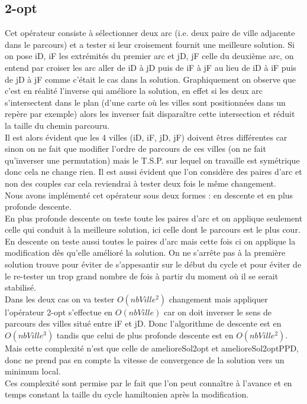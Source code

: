 \documentclass[12pt,a4paper]{article}
\begin{document}
\subsection{2-opt}
Cet opérateur consiste à sélectionner deux arc (i.e. deux paire de ville adjacente dans le parcours) et a tester si leur croisement fournit une meilleure solution. Si on pose iD, iF les extrémités du premier arc et jD, jF celle du deuxième arc, on entend par croiser les arc aller de iD à jD puis de iF à jF au lieu de iD à iF puis de jD à jF comme c’était le cas dans la solution. Graphiquement on observe que c'est en réalité l'inverse qui améliore la solution, en effet si les deux arc s’intersectent dans le plan (d'une carte où les villes sont positionnées dans un repère par exemple) alors les inverser fait disparaître cette intersection et réduit la taille du chemin parcouru.\\
Il est alors évident que les 4 villes (iD, iF, jD, jF) doivent êtres différentes car sinon on ne fait que modifier l'ordre de parcours de ces villes (on ne fait qu'inverser une permutation) mais le T.S.P. sur lequel on travaille est symétrique donc cela ne change rien. Il est aussi évident que l'on considère des paires d'arc et non des couples car cela reviendrai à tester deux fois le même changement.\\

Nous avons implémenté cet opérateur sous deux formes : en descente et en plus profonde descente.\\
En plus profonde descente on teste toute les paires d'arc et on applique seulement celle qui conduit à la meilleure solution, ici celle dont le parcours est le plus cour.\\
En descente on teste aussi toutes le paires d'arc mais cette fois ci on applique la modification dès qu'elle amélioré la solution. On ne s’arrête pas à la première solution trouve pour éviter de s'appesantir sur le début du cycle et pour éviter de le re-tester un trop grand nombre de fois à partir du moment où il se serait stabilisé.\\
Dans les deux cas on va tester $O(nbVille^2)$ changement mais appliquer l'opérateur 2-opt s’effectue en $O(nbVille)$ car on doit inverser le sens de parcours des villes situé entre iF et jD. Donc l'algorithme de descente est en $O(nbVille^3)$ tandis que celui de plus profonde descente est en $O(nbVille^2)$. Mais cette complexité n'est que celle de amelioreSol2opt et amelioreSol2optPPD, donc ne prend pas en compte la vitesse de convergence de la solution vers un minimum local.\\
Ces complexité sont permise par le fait que l'on peut connaître à l'avance et en temps constant la taille du cycle hamiltonien après la modification.
 
\end{document}
